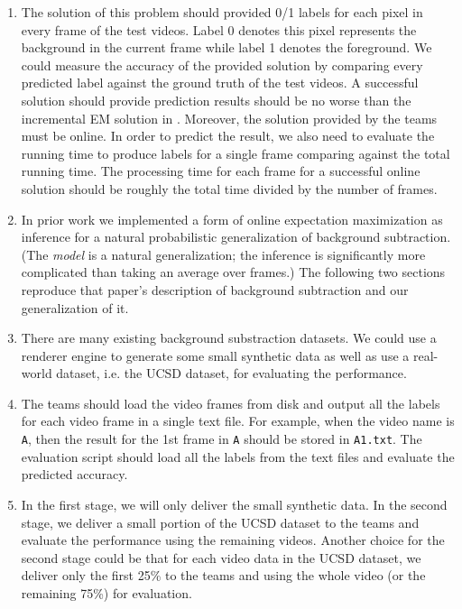 \begin{enumerate}[i]
\item The solution of this problem should provided 0/1 labels for each pixel in every frame of the test videos. Label 0 denotes this pixel represents the background in the current frame while label 1 denotes the foreground. We could measure the accuracy of the provided solution by comparing every predicted label against the ground truth of the test videos. A successful solution should provide prediction results should be no worse than the incremental EM solution in \cite{friedman1997image}.
    Moreover, the solution provided by the teams must be online. In order to predict the result, we also need to evaluate the running time to produce labels for a single frame comparing against the total running time. The processing time for each frame for a successful online solution should be roughly the total time divided by the number of frames.
\item In prior work we implemented a form of online expectation
  maximization as inference for a natural probabilistic
  generalization of background subtraction\cite{friedman1997image}.
  (The \emph{model} is a natural 
  generalization; the inference is significantly more
  complicated than taking an average over frames.)  The following two sections
  reproduce that paper's description of background subtraction and our
  generalization of it.
\item There are many existing background substraction datasets. We could use a renderer engine to generate some small synthetic data as well as use a real-world dataset, i.e. the UCSD dataset, for evaluating the performance.
\item The teams should load the video frames from disk and output all the labels for each video frame in a single text file. For example, when the video name is \texttt{A}, then the result for the 1st frame in \texttt{A} should be stored in \texttt{A1.txt}. The evaluation script should load all the labels from the text files and evaluate the predicted accuracy.
\item In the first stage, we will only deliver the small synthetic data. In the second stage, we deliver a small portion of the UCSD dataset to the teams and evaluate the performance using the remaining videos. Another choice for the second stage could be that for each video data in the UCSD dataset, we deliver only the first 25\% to the teams and using the whole video (or the remaining 75\%) for evaluation.
\end{enumerate}

